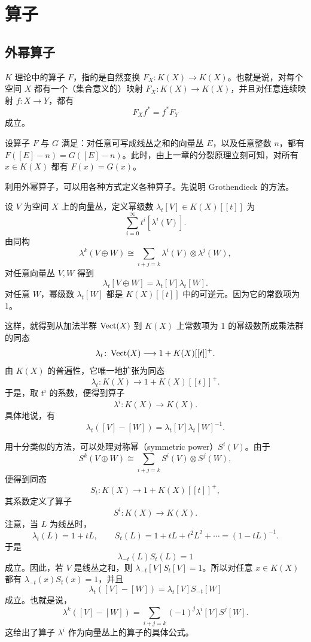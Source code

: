 \chapter{算子}
\section{外幂算子}

$K$ 理论中的算子 $F$，指的是自然变换 $F_X\colon K(X)\to K(X)$。也就是说，对每个空间 $X$ 都有一个（集合意义的）映射 $F_X\colon K(X)\to K(X)$，并且对任意连续映射 $f\colon X\to Y$，都有
\[
F_X f^*=f^* F_Y
\]
成立。


设算子 $F$ 与 $G$ 满足：对任意可写成线丛之和的向量丛 $E$，以及任意整数 $n$，都有 $F([E]-n)=G([E]-n)$。此时，由上一章的分裂原理立刻可知，对所有 $x\in K(X)$ 都有 $F(x)=G(x)$。

利用外幂算子，可以用各种方式定义各种算子。先说明 Grothendieck 的方法。

设 $V$ 为空间 $X$ 上的向量丛，定义幂级数 $\lambda_t[V]\in K(X)[[t]]$ 为
\[
\sum_{i=0}^{\infty}t^i[\lambda^i(V)].
\]
由同构
\[
\lambda^k(V\oplus W)\cong\sum_{i+j=k}\lambda^i(V)\otimes\lambda^j(W),
\]
对任意向量丛 $V,W$ 得到
\[
\lambda_t[V\oplus W]=\lambda_t[V]\lambda_t[W].
\]
对任意 $W$，幂级数 $\lambda_t[W]$ 都是 $K(X)[[t]]$ 中的可逆元。因为它的常数项为 1。

这样，就得到从加法半群 $\operatorname{Vect}(X)$ 到 $K(X)$ 上常数项为 1 的幂级数所成乘法群的同态
\[
\lambda_t\colon \operatorname{Vect}(X)\longrightarrow 1+K(X)[[t]]^{+}.
\]
由 $K(X)$ 的普遍性，它唯一地扩张为同态
\[
\lambda_t\colon K(X)\longrightarrow 1+K(X)[[t]]^{+}.
\]
于是，取 $t^i$ 的系数，便得到算子
\[
\lambda^i\colon K(X)\longrightarrow K(X).
\]
具体地说，有
\[
\lambda_t([V]-[W])=\lambda_t[V]\lambda_t[W]^{-1}.
\]

用十分类似的方法，可以处理对称幂（symmetric power）$S^i(V)$。由于
\[
S^k(V\oplus W)\cong\sum_{i+j=k}S^i(V)\otimes S^j(W),
\]
便得到同态
\[
S_t\colon K(X)\longrightarrow 1+K(X)[[t]]^{+},
\]
其系数定义了算子
\[
S^i\colon K(X)\longrightarrow K(X).
\]
注意，当 $L$ 为线丛时，
\[
\lambda_t(L)=1+tL,\qquad
S_t(L)=1+tL+t^2L^2+\cdots=(1-tL)^{-1}.
\]
于是
\[
\lambda_{-t}(L)S_t(L)=1
\]
成立。因此，若 $V$ 是线丛之和，则 $\lambda_{-t}[V]S_t[V]=1$。所以对任意 $x\in K(X)$ 都有 $\lambda_{-t}(x)S_t(x)=1$，并且
\[
\lambda_t([V]-[W])=\lambda_t[V]S_{-t}[W]
\]
成立。也就是说，
\[
\lambda^k([V]-[W])=\sum_{i+j=k}(-1)^j\lambda^i[V]S^j[W].
\]
这给出了算子 $\lambda^i$ 作为向量丛上的算子的具体公式。

